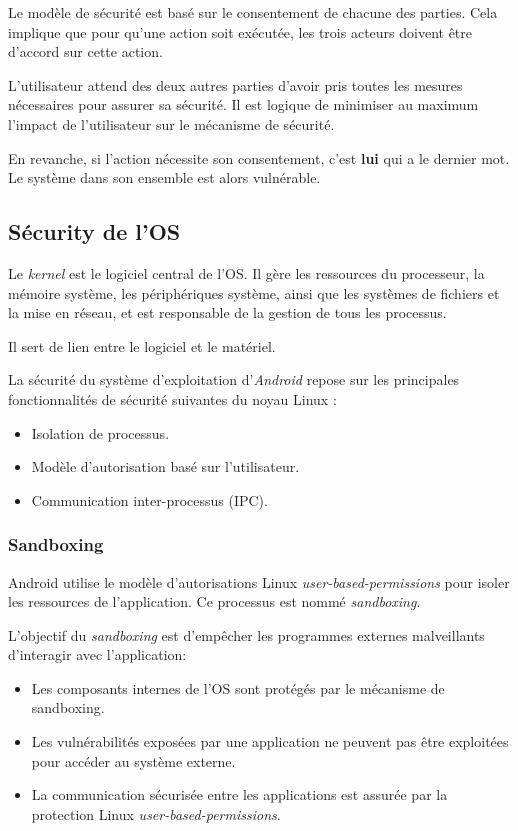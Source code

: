 \documentclass[
  french,
  paper=a4,
  ,captions=tableheading
]{scrartcl}
\providecommand{\tightlist}{%
  \setlength{\itemsep}{0pt}\setlength{\parskip}{0pt}}
\begin{document}
Le modèle de sécurité est basé sur le consentement de chacune des
parties. Cela implique que pour qu'une action soit exécutée, les trois
acteurs doivent être d'accord sur cette action.

L'utilisateur attend des deux autres parties d'avoir pris toutes les
mesures nécessaires pour assurer sa sécurité. Il est logique de
minimiser au maximum l'impact de l'utilisateur sur le mécanisme de
sécurité.

En revanche, si l'action nécessite son consentement, c'est \textbf{lui}
qui a le dernier mot. Le système dans son ensemble est alors vulnérable.

\hypertarget{suxe9curity-de-los}{%
\subsection{Sécurity de l'OS}\label{suxe9curity-de-los}}

Le \emph{kernel} est le logiciel central de l'OS. Il gère les ressources
du processeur, la mémoire système, les périphériques système, ainsi que
les systèmes de fichiers et la mise en réseau, et est responsable de la
gestion de tous les processus.

Il sert de lien entre le logiciel et le matériel.

La sécurité du système d'exploitation d'\emph{Android} repose sur les
principales fonctionnalités de sécurité suivantes du noyau Linux :

\begin{itemize}
\tightlist
\item
  Isolation de processus.
\item
  Modèle d'autorisation basé sur l'utilisateur.
\item
  Communication inter-processus (IPC).
\end{itemize}

\hypertarget{sandboxing}{%
\subsubsection{Sandboxing}\label{sandboxing}}

Android utilise le modèle d'autorisations Linux
\emph{user-based-permissions} pour isoler les ressources de
l'application. Ce processus est nommé \emph{sandboxing}.

L'objectif du \emph{sandboxing} est d'empêcher les programmes externes
malveillants d'interagir avec l'application:

\begin{itemize}
\tightlist
\item
  Les composants internes de l'OS sont protégés par le mécanisme de
  sandboxing.
\item
  Les vulnérabilités exposées par une application ne peuvent pas être
  exploitées pour accéder au système externe.
\item
  La communication sécurisée entre les applications est assurée par la
  protection Linux \emph{user-based-permissions}.
\end{itemize}
\end{document}
